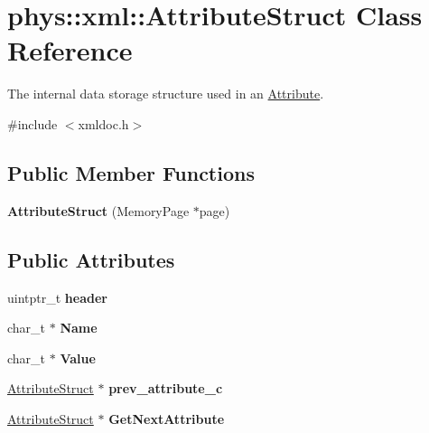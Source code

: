 \hypertarget{structphys_1_1xml_1_1AttributeStruct}{
\section{phys::xml::AttributeStruct Class Reference}
\label{dd/dfe/structphys_1_1xml_1_1AttributeStruct}
}


The internal data storage structure used in an \hyperlink{classphys_1_1xml_1_1Attribute}{Attribute}.  




{\ttfamily \#include $<$xmldoc.h$>$}

\subsection*{Public Member Functions}
\begin{DoxyCompactItemize}
\item 
\hypertarget{structphys_1_1xml_1_1AttributeStruct_ae56b37b04de2de9b06f2ab62063860d0}{
{\bfseries AttributeStruct} (MemoryPage $\ast$page)}
\label{dd/dfe/structphys_1_1xml_1_1AttributeStruct_ae56b37b04de2de9b06f2ab62063860d0}

\end{DoxyCompactItemize}
\subsection*{Public Attributes}
\begin{DoxyCompactItemize}
\item 
\hypertarget{structphys_1_1xml_1_1AttributeStruct_a9fd6577532fd75614cbbeef25ebc483d}{
uintptr\_\-t {\bfseries header}}
\label{dd/dfe/structphys_1_1xml_1_1AttributeStruct_a9fd6577532fd75614cbbeef25ebc483d}

\item 
\hypertarget{structphys_1_1xml_1_1AttributeStruct_af33547ea3e8c21d16737fc7ebcb94c95}{
char\_\-t $\ast$ {\bfseries Name}}
\label{dd/dfe/structphys_1_1xml_1_1AttributeStruct_af33547ea3e8c21d16737fc7ebcb94c95}

\item 
\hypertarget{structphys_1_1xml_1_1AttributeStruct_a2a7018296eb97ef342b5230d59f6e6ee}{
char\_\-t $\ast$ {\bfseries Value}}
\label{dd/dfe/structphys_1_1xml_1_1AttributeStruct_a2a7018296eb97ef342b5230d59f6e6ee}

\item 
\hypertarget{structphys_1_1xml_1_1AttributeStruct_ad37be3bf8c8d5a469396e882af402f89}{
\hyperlink{structphys_1_1xml_1_1AttributeStruct}{AttributeStruct} $\ast$ {\bfseries prev\_\-attribute\_\-c}}
\label{dd/dfe/structphys_1_1xml_1_1AttributeStruct_ad37be3bf8c8d5a469396e882af402f89}

\item 
\hypertarget{structphys_1_1xml_1_1AttributeStruct_acbd550c08cec46228d1820957a153672}{
\hyperlink{structphys_1_1xml_1_1AttributeStruct}{AttributeStruct} $\ast$ {\bfseries GetNextAttribute}}
\label{dd/dfe/structphys_1_1xml_1_1AttributeStruct_acbd550c08cec46228d1820957a153672}

\end{DoxyCompactItemize}


